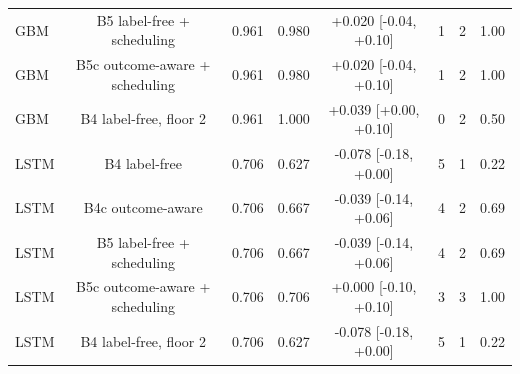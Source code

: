 \documentclass[10pt,onecolumn,letterpaper]{article}
\begin{document}
\begin{table}[!t]
{\begin{tabular}{lccccccc}
GBM & B5 label-free + scheduling & 0.961 & 0.980 & +0.020 [-0.04, +0.10] & 1 & 2 & 1.00 \\
GBM & B5c outcome-aware + scheduling & 0.961 & 0.980 & +0.020 [-0.04, +0.10] & 1 & 2 & 1.00 \\
GBM & B4 label-free, floor 2 & 0.961 & 1.000 & +0.039 [+0.00, +0.10] & 0 & 2 & 0.50 \\
LSTM & B4 label-free & 0.706 & 0.627 & -0.078 [-0.18, +0.00] & 5 & 1 & 0.22 \\
LSTM & B4c outcome-aware & 0.706 & 0.667 & -0.039 [-0.14, +0.06] & 4 & 2 & 0.69 \\
LSTM & B5 label-free + scheduling & 0.706 & 0.667 & -0.039 [-0.14, +0.06] & 4 & 2 & 0.69 \\
LSTM & B5c outcome-aware + scheduling & 0.706 & 0.706 & +0.000 [-0.10, +0.10] & 3 & 3 & 1.00 \\
LSTM & B4 label-free, floor 2 & 0.706 & 0.627 & -0.078 [-0.18, +0.00] & 5 & 1 & 0.22 \\
\bottomrule
\end{tabular}}
\end{table}
\begin{table}[!t]
\caption{Paired Comparison Pooled Over Five Seeds (r4.2; Descriptive, Since the Seeds Share the Same Insiders)\label{tab:s-paired-pooled}}
\centering
{}
\end{table}
\end{document}
